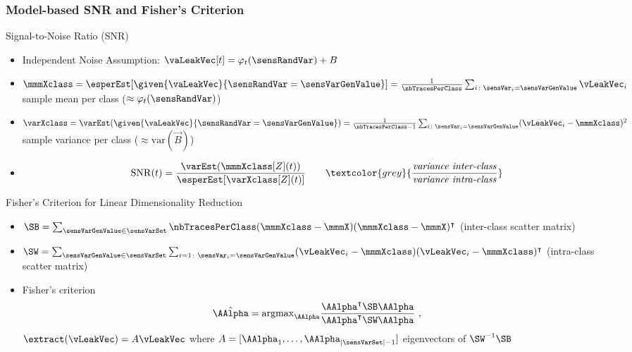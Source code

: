 \begin{frame}
\frametitle{Model-based SNR and Fisher's Criterion}
\vspace*{-12pt}
\begin{block}{Signal-to-Noise Ratio (SNR)}
\begin{itemize}
\item Independent Noise Assumption: $\vaLeakVec[t] = \varphi_t(\sensRandVar)+B$

\item $\mmmXclass= \esperEst[\given{\vaLeakVec}{\sensRandVar = \sensVarGenValue}] = \frac{1}{\nbTracesPerClass}\sum_{i\colon \sensVar_i=\sensVarGenValue} \vLeakVec_i $ sample mean per class ($\approx \varphi_t(\sensRandVar)$)
\item $\varXclass = \varEst(\given{\vaLeakVec}{\sensRandVar = \sensVarGenValue}) = \frac{1}{\nbTracesPerClass-1}\sum_{i\colon \sensVar_i=\sensVarGenValue} (\vLeakVec_i - \mmmXclass)^2 $ sample variance per class ($\approx \mathrm{var}(\vec{B})$) 
\item \begin{equation*}\mathrm{SNR}(t) = \frac{\varEst(\mmmXclass[Z](t))}{\esperEst[\varXclass[Z](t)]} \qquad \textcolor{grey}{\frac{\text{\emph{variance inter-class}}}{\text{\emph{variance intra-class}}}} \end{equation*}
\end{itemize}
\end{block}

\begin{block}{Fisher's Criterion for Linear Dimensionality Reduction}

\begin{itemize}
\item $\SB = \sum_{\sensVarGenValue\in\sensVarSet}\nbTracesPerClass(\mmmXclass-\mmmX)(\mmmXclass-\mmmX)^\intercal $ (inter-class scatter matrix)
\item $\SW = \sum_{\sensVarGenValue\in\sensVarSet}\sum_{i=1\colon \sensVar_i=\sensVarGenValue}(\vLeakVec_i-\mmmXclass)(\vLeakVec_i-\mmmXclass)^\intercal$ (intra-class scatter matrix)
\item Fisher's criterion
 \begin{equation}\label{eq:LDA}
\hat{ \AAlpha}=\mathrm{argmax}_{\AAlpha} \frac{\AAlpha^\intercal \SB \AAlpha}{\AAlpha^\intercal \SW \AAlpha} \mbox{ ,}
 \end{equation}
 $\extract(\vLeakVec) = A\vLeakVec $ where $A=[\AAlpha_1, \dots, \AAlpha_{|\sensVarSet|-1}]$ eigenvectors of $\SW^{-1}\SB$
\end{itemize}

\end{block}
\end{frame}


